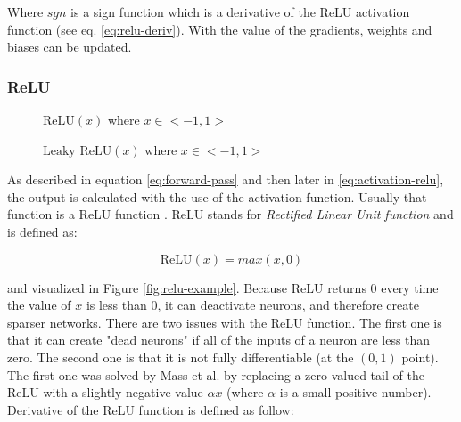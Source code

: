 Where $sgn$ is a sign function which is a derivative of the ReLU activation function (see eq. \ref{eq:relu-deriv}). With the value of the gradients, weights and biases can be updated.

\subsubsection*{ReLU}

\begin{figure}
  \caption{$\text{ReLU}(x)$ where $x \in <-1,1>$}\label{fig:relu-example}
  \caption{$\text{Leaky ReLU}(x)$ where $x \in <-1,1>$}\label{fig:leaky-relu-example}
\end{figure}

As described in equation \ref{eq:forward-pass} and then later in \ref{eq:activation-relu}, the output is calculated with the use of the activation function. Usually that function is a ReLU function \cite{hahnloser2000digital}. ReLU stands for \textit{Rectified Linear Unit function} and is defined as:

\begin{equation}
    \text{ReLU}(x) = max(x,0)
\end{equation}

and visualized in Figure \ref{fig:relu-example}. Because ReLU returns $0$ every time the value of $x$ is less than $0$, it can deactivate neurons, and therefore create sparser networks. There are two issues with the ReLU function. The first one is that it can create "dead neurons" if all of the inputs of a neuron are less than zero. The second one is that it is not fully differentiable (at the $(0,1)$ point). The first one was solved by Mass et al. \cite{maas2013rectifier} by replacing a zero-valued tail of the ReLU with a slightly negative value $\alpha x$ (where $\alpha$ is a small positive number). Derivative of the ReLU function is defined as follow:

